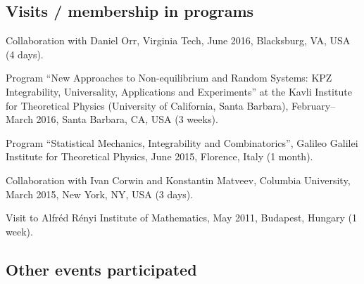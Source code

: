 \documentclass[letterpaper,11pt]{article}
\begin{document}
\subsection*{Visits / membership in programs}

\begin{etaremune}
	\item Collaboration with Daniel Orr, 
	Virginia Tech, 
	June 2016,
	Blacksburg, VA, USA (4 days).
	\item
	Program ``New Approaches to Non-equilibrium and Random Systems: KPZ Integrability, Universality, Applications and Experiments''
	at the Kavli Institute for Theoretical Physics (University of California, Santa Barbara),
	February--March 2016, Santa Barbara, CA, USA (3 weeks).
	\item
	Program ``Statistical Mechanics, Integrability and Combinatorics'',
	Galileo Galilei Institute for Theoretical Physics, June 2015, Florence, Italy (1 month).
	\item Collaboration with Ivan Corwin and Konstantin Matveev,
	Columbia University, March 2015, New York, NY, USA (3 days).
	\item Visit to Alfr\'ed R\'enyi Institute of Mathematics,
	May 2011, Budapest, Hungary (1 week).
\end{etaremune}

\subsection*{Other events participated}
\end{document}

